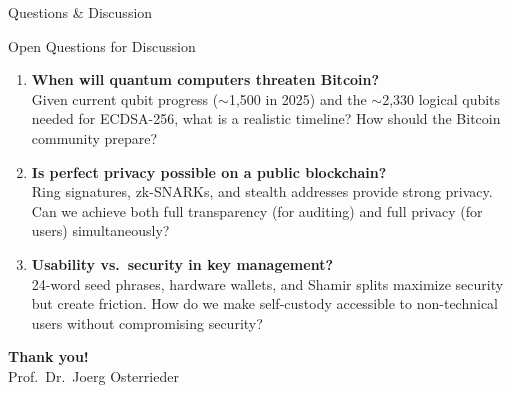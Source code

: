 \documentclass[8pt,aspectratio=169]{beamer}
\begin{document}
\begin{frame}{Questions \& Discussion}
\begin{block}{Open Questions for Discussion}
\begin{enumerate}\large
  \item \textbf{When will quantum computers threaten Bitcoin?}\\[2mm]
    \small Given current qubit progress ($\sim$1{,}500 in 2025) and the $\sim$2{,}330 logical qubits needed for ECDSA-256, what is a realistic timeline? How should the Bitcoin community prepare?
  \vspace{3mm}
  \item \textbf{Is perfect privacy possible on a public blockchain?}\\[2mm]
    \small Ring signatures, zk-SNARKs, and stealth addresses provide strong privacy. Can we achieve both full transparency (for auditing) and full privacy (for users) simultaneously?
  \vspace{3mm}
  \item \textbf{Usability vs.\ security in key management?}\\[2mm]
    \small 24-word seed phrases, hardware wallets, and Shamir splits maximize security but create friction. How do we make self-custody accessible to non-technical users without compromising security?
\end{enumerate}
\end{block}
\vspace{4mm}
\begin{center}
\textcolor{mlpurple}{\Large\textbf{Thank you!}}\\[2mm]
\textcolor{mlgray}{\small Prof.~Dr.~Joerg Osterrieder}
\end{center}
\end{frame}
\end{document}
